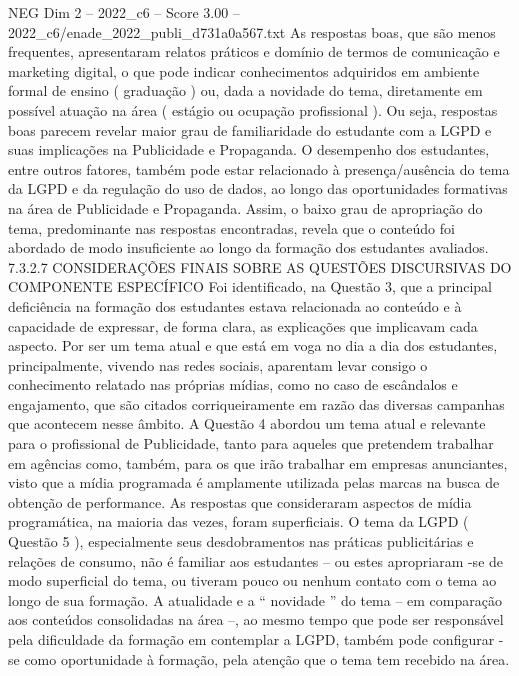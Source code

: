 \begin{textsample}{NEG Dim 2 – 2022\_c6 – Score 3.00 – 2022\_c6/enade\_2022\_publi\_d731a0a567.txt}
As respostas boas, que são menos frequentes, apresentaram relatos práticos e domínio de termos de comunicação e marketing digital, o que pode indicar conhecimentos adquiridos em ambiente formal de ensino ( graduação ) ou, dada a novidade do tema, diretamente em possível atuação na área ( estágio ou ocupação profissional ).
Ou seja, respostas boas parecem revelar maior grau de familiaridade do estudante com a LGPD e suas implicações na Publicidade e Propaganda.
O desempenho dos estudantes, entre outros fatores, também pode estar relacionado à presença/ausência do tema da LGPD e da regulação do uso de dados, ao longo das oportunidades formativas na área de Publicidade e Propaganda.
Assim, o baixo grau de apropriação do tema, predominante nas respostas encontradas, revela que o conteúdo foi abordado de modo insuficiente ao longo da formação dos estudantes avaliados. 7.3.2.7 CONSIDERAÇÕES FINAIS SOBRE AS QUESTÕES DISCURSIVAS DO COMPONENTE ESPECÍFICO Foi identificado, na Questão 3, que a principal deficiência na formação dos estudantes estava relacionada ao conteúdo e à capacidade de expressar, de forma clara, as explicações que implicavam cada aspecto.
Por ser um tema atual e que está em voga no dia a dia dos estudantes, principalmente, vivendo nas redes sociais, aparentam levar consigo o conhecimento relatado nas próprias mídias, como no caso de escândalos e engajamento, que são citados corriqueiramente em razão das diversas campanhas que acontecem nesse âmbito.
A Questão 4 abordou um tema atual e relevante para o profissional de Publicidade, tanto para aqueles que pretendem trabalhar em agências como, também, para os que irão trabalhar em empresas anunciantes, visto que a mídia programada é amplamente utilizada pelas marcas na busca de obtenção de performance.
As respostas que consideraram aspectos de mídia programática, na maioria das vezes, foram superficiais.
O tema da LGPD ( Questão 5 ), especialmente seus desdobramentos nas práticas publicitárias e relações de consumo, não é familiar aos estudantes – ou estes apropriaram -se de modo superficial do tema, ou tiveram pouco ou nenhum contato com o tema ao longo de sua formação.
A atualidade e a “ novidade ” do tema – em comparação aos conteúdos consolidadas na área –, ao mesmo tempo que pode ser responsável pela dificuldade da formação em contemplar a LGPD, também pode configurar -se como oportunidade à formação, pela atenção que o tema tem recebido na área.

\end{textsample}
